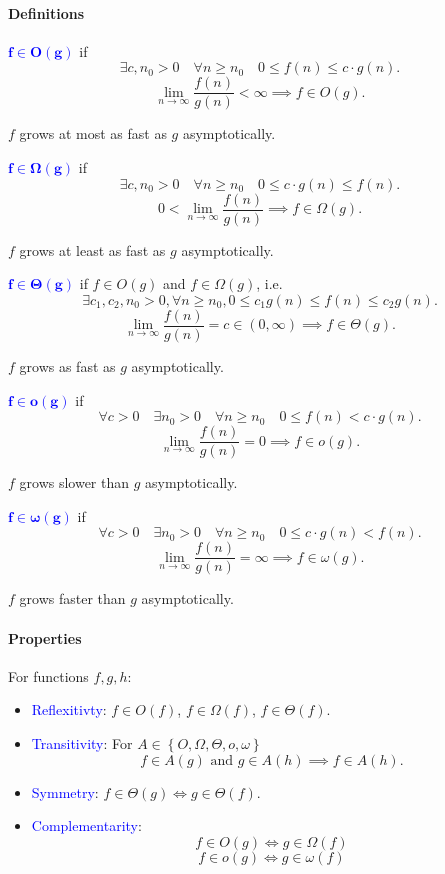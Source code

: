 \paragraph{Definitions}
\textcolor{Blue}{$\mathbf{f \in O(g)}$} if 
\[\exists c,n_0>0\quad \forall n\ge n_0\quad 0\le f(n)\le c\cdot g(n).\] 
\[\lim_{n \to \infty} \frac{f(n)}{g(n)}<\infty\implies f\in O(g).\] 

$f$ grows \textcolor{Bittersweet}{at most as fast as $g$} asymptotically.

\textcolor{Blue}{$\mathbf{f \in \Omega(g)}$} if
\[\exists c,n_0>0\quad \forall n\ge n_0\quad 0\le c\cdot g(n)\le f(n).\]
\[0<\lim_{n \to \infty} \frac{f(n)}{g(n)}\implies f\in \Omega(g).\]

$f$ grows \textcolor{Bittersweet}{at least as fast as $g$} asymptotically.

\textcolor{Blue}{$\mathbf{f \in \Theta(g)}$} if $f\in O(g)$ and $f\in \Omega(g)$, i.e. 
\[\exists c_1,c_2,n_0>0, \forall n\ge n_0, 0\le c_1 g(n)\le
f(n)\le c_2 g(n).\]
\[\lim_{n \to \infty} \frac{f(n)}{g(n)}=c\in (0,\infty)\implies f\in \Theta(g).\]

$f$ grows \textcolor{Bittersweet}{as fast as $g$} asymptotically.

\textcolor{Blue}{$\mathbf{f \in o(g)}$} if
\[\forall c>0\quad \exists n_0>0\quad \forall n\ge n_0\quad 0\le f(n)< c\cdot g(n).\]
\[\lim_{n \to \infty} \frac{f(n)}{g(n)}=0\implies f\in o(g).\] 

$f$ grows \textcolor{Bittersweet}{slower than $g$} asymptotically.

\textcolor{Blue}{$\mathbf{f \in \omega(g)}$} if
\[\forall c>0\quad \exists n_0>0\quad \forall n\ge n_0\quad 0\le c\cdot g(n)< f(n).\]
\[\lim_{n \to \infty} \frac{f(n)}{g(n)}=\infty\implies f\in \omega(g).\]

$f$ grows \textcolor{Bittersweet}{faster than $g$} asymptotically.

\paragraph{Properties}
For functions $f,g,h$:
\begin{itemize}
  \item \textcolor{Blue}{Reflexitivty}: $f\in O(f)$, $f\in \Omega(f)$, $f\in \Theta(f)$.
  \item \textcolor{Blue}{Transitivity}: For $A\in \left\{
    O,\Omega,\Theta,o,\omega \right\} $
    \[f\in A(g)\text{ and }g\in A(h)\implies f\in A(h).\]
  \item \textcolor{Blue}{Symmetry}: $f\in \Theta(g)\iff g\in \Theta(f)$.
  \item \textcolor{Blue}{Complementarity}: 
    \[f\in O(g)\iff g\in \Omega(f)\]
    \[f\in o(g)\iff g\in \omega(f)\]
\end{itemize}
